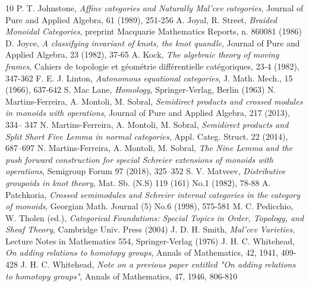 \documentclass[11pt]{amsart}
\theoremstyle{plain}
\theoremstyle{definition}
\theoremstyle{remark}
\begin{document}
\begin{thebibliography}{10}
 P. T. Johnstone, \emph{Affine categories and Naturally Mal'cev categories}, Journal of Pure and Applied Algebra, 61 (1989), 251-256
 A. Joyal, R. Street, \emph{Braided Monoidal Categories}, preprint Macquarie Mathematics Reports, n. 860081 (1986)
 D. Joyce, \emph{A classifying invariant of knots, the knot quandle}, Journal of Pure and Applied Algebra, 23 (1982), 37-65
 A. Kock, \emph{The algebraic theory of moving frames}, Cahiers de topologie et géométrie différentielle catégoriques, 23-4 (1982), 347-362
 F. E. J. Linton, \emph{Autonomous equational categories}, J. Math. Mech., 15 (1966), 637-642
 S. Mac Lane, \emph{Homology}, Springer-Verlag, Berlin (1963)
 N. Martins-Ferreira, A. Montoli, M. Sobral, \emph{Semidirect products and crossed
modules in monoids with operations}, Journal of Pure and Applied Algebra, 217 (2013), 334–
347
 N. Martins-Ferreira, A. Montoli, M. Sobral, \emph{Semidirect products and Split Short
 Five Lemma in normal categories}, Appl. Categ. Struct. 22 (2014), 687–697
  N. Martins-Ferreira, A. Montoli, M. Sobral, \emph{The Nine Lemma and the push forward construction for special Schreier extensions of monoids with operations}, Semigroup Forum 97 (2018), 325–352
 S. V. Matveev, \emph{Distributive groupoids in knot theory}, Mat. Sb. (N.S) 119 (161) No.1 (1982), 78-88
 A. Patchkoria, \emph{Crossed semimodules and Schreier internal categories in the category of monoids}, Georgian Math. Journal (5) No.6 (1998), 575-581
 M. C. Pedicchio, W. Tholen (ed.), \emph{Categorical Foundations: Special Topics in Order, Topology, and Sheaf Theory}, Cambridge Univ. Press (2004)
 J. D. H. Smith, \emph{Mal'cev Varieties}, Lecture Notes in Mathematics 554, Springer-Verlag (1976)
 J. H. C. Whitehead, \emph{On adding relations to homotopy groups}, Annals of Mathematics, 42, 1941, 409-428
 J. H. C. Whitehead, \emph{Note on a previous paper entitled "On adding relations to homotopy groups"}, Annals of Mathematics, 47, 1946, 806-810
\end{thebibliography}
\end{document}
